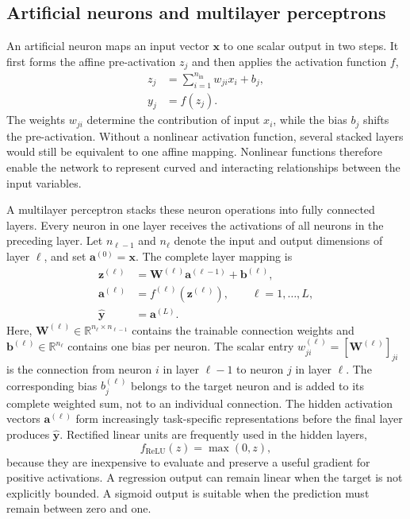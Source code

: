 \documentclass[
    a4paper,
    12pt,
    titlepage,
    bibliography=totoc,
    twoside=on,
    parskip=false,
    numbers=noenddot,
    cleardoublepage=empty,
    DIV=12,
    BCOR=12.0mm,
    headheight=36pt,
    headings=openright
]{scrreprt}
\begin{document}
\subsection{Artificial neurons and multilayer perceptrons}
\label{sec:fundamental_mlp}
An artificial neuron maps an input vector $\mathbf{x}$ to one scalar output in two steps. It first forms the affine pre-activation $z_j$ and then applies the activation function $f$,
\begin{equation}
    \begin{aligned}
        z_j&=\sum_{i=1}^{n_{\mathrm{in}}}w_{ji}x_i+b_j,\\
        y_j&=f(z_j).
    \end{aligned}
    \label{eq:fundamental_neuron}
\end{equation}
The weights $w_{ji}$ determine the contribution of input $x_i$, while the bias $b_j$ shifts the pre-activation. Without a nonlinear activation function, several stacked layers would still be equivalent to one affine mapping. Nonlinear functions therefore enable the network to represent curved and interacting relationships between the input variables.

A multilayer perceptron stacks these neuron operations into fully connected layers. Every neuron in one layer receives the activations of all neurons in the preceding layer. Let $n_{\ell-1}$ and $n_{\ell}$ denote the input and output dimensions of layer $\ell$, and set $\mathbf{a}^{(0)}=\mathbf{x}$. The complete layer mapping is
\begin{equation}
    \begin{aligned}
        \mathbf{z}^{(\ell)}
        &=
        \mathbf{W}^{(\ell)}\mathbf{a}^{(\ell-1)}
        +\mathbf{b}^{(\ell)},\\
        \mathbf{a}^{(\ell)}
        &=
        f^{(\ell)}\!\left(\mathbf{z}^{(\ell)}\right),
        \qquad \ell=1,\ldots,L,\\
        \widehat{\mathbf{y}}
        &=
        \mathbf{a}^{(L)}.
    \end{aligned}
    \label{eq:fundamental_mlp}
\end{equation}
Here, $\mathbf{W}^{(\ell)}\in\mathbb{R}^{n_{\ell}\times n_{\ell-1}}$ contains the trainable connection weights and $\mathbf{b}^{(\ell)}\in\mathbb{R}^{n_{\ell}}$ contains one bias per neuron. The scalar entry $w_{ji}^{(\ell)}=[\mathbf{W}^{(\ell)}]_{ji}$ is the connection from neuron $i$ in layer $\ell-1$ to neuron $j$ in layer $\ell$. The corresponding bias $b_j^{(\ell)}$ belongs to the target neuron and is added to its complete weighted sum, not to an individual connection. The hidden activation vectors $\mathbf{a}^{(\ell)}$ form increasingly task-specific representations before the final layer produces $\widehat{\mathbf{y}}$. Rectified linear units are frequently used in the hidden layers,
\begin{equation}
    f_{\mathrm{ReLU}}(z)=\max(0,z),
    \label{eq:fundamental_relu}
\end{equation}
because they are inexpensive to evaluate and preserve a useful gradient for positive activations. A regression output can remain linear when the target is not explicitly bounded. A sigmoid output is suitable when the prediction must remain between zero and one.
\end{document}
